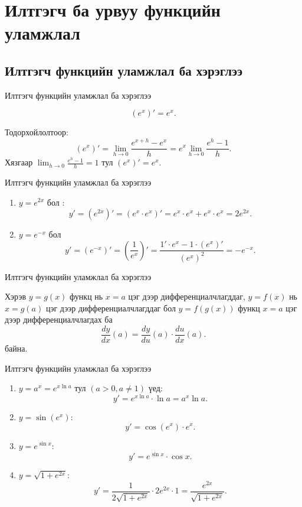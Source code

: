 \section{Илтгэгч ба урвуу функцийн уламжлал}
\subsection*{Илтгэгч функцийн уламжлал ба хэрэглээ}
\begin{frame}[allowframebreaks]{Илтгэгч функцийн уламжлал ба хэрэглээ}
\begin{theorem}
\[
(e^x)' = e^x.
\]
\end{theorem}

\begin{prof}
Тодорхойлолтоор:
\[
(e^x)' = \lim_{h\to 0} \frac{e^{x+h} - e^x}{h}
= e^x \lim_{h\to 0}\frac{e^h - 1}{h}.
\]
Хязгаар $\displaystyle \lim_{h\to 0}\frac{e^h - 1}{h}=1$ тул $(e^x)'=e^x$.
\end{prof}
\end{frame}

\begin{frame}[allowframebreaks]{Илтгэгч функцийн уламжлал ба хэрэглээ}
\begin{example}
\begin{enumerate}
  \item $y=e^{2x}$ бол :
  \[
  y' = (e^{2x})'=(e^x\cdot e^x)'=e^x\cdot e^x+e^x\cdot e^x = 2e^{2x}.
  \]
  \item $y=e^{-x}$ бол
  \[
  y' = (e^{-x})'=\left(\dfrac{1}{e^x}\right)'=\dfrac{1'\cdot e^x-1\cdot (e^x)'}{(e^x)^2}= -e^{-x}.
  \]
\end{enumerate}
\end{example}
\end{frame}

\begin{frame}[allowframebreaks]{Илтгэгч функцийн уламжлал ба хэрэглээ}
\begin{theorem}
Хэрэв $y=g(x)$ функц нь $x=a$ цэг дээр дифференциалчлагддаг, $y=f(x)$ нь $x=g(a)$ цэг дээр дифференциалчлагддаг бол $y=f(g(x))$ функц $x=a$ цэг дээр дифференциалчлагдах ба
\[
\boxed{\frac{dy}{dx}(a) = \frac{dy}{du}(a)\cdot\frac{du}{dx}(a)}.
\] байна.
\end{theorem}
\end{frame}

\begin{frame}[allowframebreaks]{Илтгэгч функцийн уламжлал ба хэрэглээ}
\begin{example}
\begin{enumerate}
  \item $y=a^x=e^{x\ln a}$ тул $(a>0, a\ne1)$ үед:
  \[
  y' = e^{x\ln a}\cdot \ln a = a^x \ln a.
  \]
  \item $y=\sin(e^x)$:
  \[
  y' = \cos(e^x)\cdot e^x.
  \]
  \item $y=e^{\sin x}$:
  \[
  y' = e^{\sin x}\cdot \cos x.
  \]
  \item $y=\sqrt{1+e^{2x}}$:
  \[
  y'=\frac{1}{2\sqrt{1+e^{2x}}}\cdot 2e^{2x}\cdot 1
  =\frac{e^{2x}}{\sqrt{1+e^{2x}}}.
  \]
\end{enumerate}
\end{example}
\end{frame}

